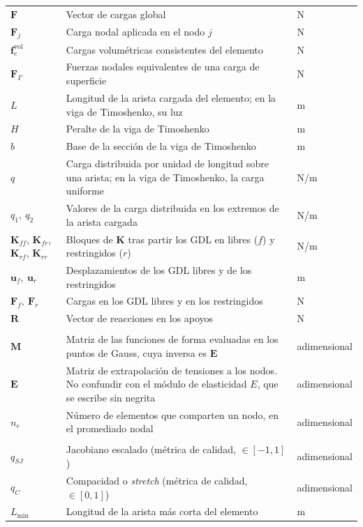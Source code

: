 \begin{longtable}{@{}>{\raggedright\arraybackslash}p{3.0cm}p{7.8cm}p{3.0cm}@{}}
$\bm{F}$ & Vector de cargas global & N \\
$\bm{F}_j$ & Carga nodal aplicada en el nodo $j$ & N \\
$\bm{f}_e^{\text{vol}}$ & Cargas volumétricas consistentes del elemento & N \\
$\bm{F}_\Gamma$ & Fuerzas nodales equivalentes de una carga de superficie & N \\
$L$ & Longitud de la arista cargada del elemento; en la viga de Timoshenko, su luz & m \\
$H$ & Peralte de la viga de Timoshenko & m \\
$b$ & Base de la sección de la viga de Timoshenko & m \\
$q$ & Carga distribuida por unidad de longitud sobre una arista; en la viga de Timoshenko, la carga uniforme & N/m \\
$q_1,\ q_2$ & Valores de la carga distribuida en los extremos de la arista cargada & N/m \\
$\bm{K}_{ff}$, $\bm{K}_{fr}$, $\bm{K}_{rf}$, $\bm{K}_{rr}$ & Bloques de $\bm{K}$ tras partir los GDL en libres ($f$) y restringidos ($r$) & N/m \\
$\bm{u}_f,\ \bm{u}_r$ & Desplazamientos de los GDL libres y de los restringidos & m \\
$\bm{F}_f,\ \bm{F}_r$ & Cargas en los GDL libres y en los restringidos & N \\
$\bm{R}$ & Vector de reacciones en los apoyos & N \\
\addlinespace
\multicolumn{3}{@{}l}{\textit{Recuperación de tensiones}} \\
\addlinespace
$\bm{M}$ & Matriz de las funciones de forma evaluadas en los puntos de Gauss, cuya inversa es $\bm{E}$ & adimensional \\
$\bm{E}$ & Matriz de extrapolación de tensiones a los nodos. No confundir con el módulo de elasticidad $E$, que se escribe sin negrita & adimensional \\
$n_e$ & Número de elementos que comparten un nodo, en el promediado nodal & adimensional \\
\addlinespace
\multicolumn{3}{@{}l}{\textit{Calidad geométrica de la malla}} \\
\addlinespace
$q_{SJ}$ & Jacobiano escalado (métrica de calidad, $\in[-1,1]$) & adimensional \\
$q_C$ & Compacidad o \emph{stretch} (métrica de calidad, $\in[0,1]$) & adimensional \\
$L_{\min}$ & Longitud de la arista más corta del elemento & m \\

\end{longtable}
